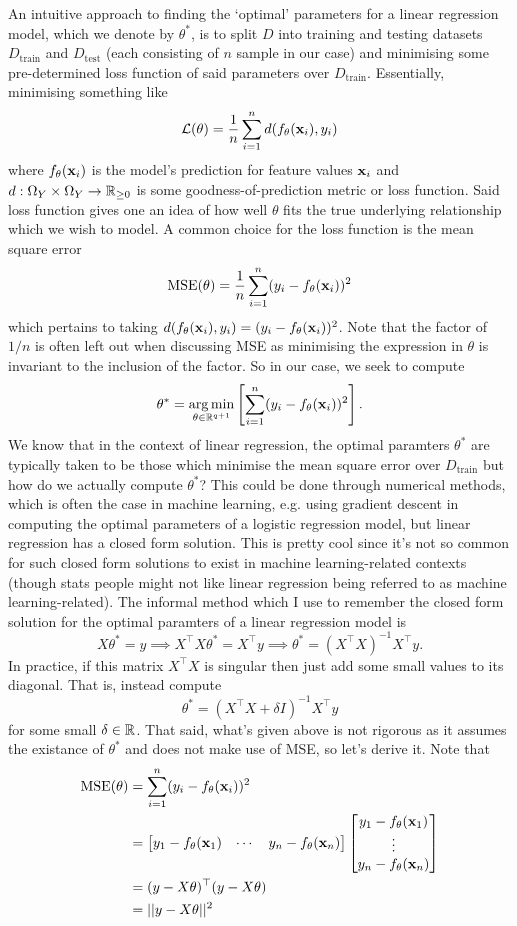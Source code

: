 \documentclass[11pt]{article}
\begin{document}
An intuitive approach to finding the `optimal' parameters for a linear regression model, which we denote by $\theta^{*}$, is to split $D$ into training and testing datasets $D_{\text{train}}$ and $D_{\text{test}}$ (each consisting of $n$ sample in our case) and minimising some pre-determined loss function of said parameters over $D_{\text{train}}$. Essentially, minimising something like
$$
\mathcal{L}(\theta)
=
\frac{1}{n}\sum_{i=1}^nd(f_{\theta}(\mathbf{x}_i), y_i)
$$
where $f_{\theta}(\mathbf{x}_i)$ is the model's prediction for feature values $\mathbf{x}_i$ and $d:\Omega_Y\times\Omega_Y\rightarrow\mathbb{R}_{\geq0}$ is some goodness-of-prediction metric or loss function. Said loss function gives one an idea of how well $\theta$ fits the true underlying relationship which we wish to model. A common choice for the loss function is the mean square error
$$
\text{MSE}(\theta)
=
\frac{1}{n}\sum_{i=1}^n(y_i-f_{\theta}(\mathbf{x}_i))^2
$$
which pertains to taking $d(f_{\theta}(\mathbf{x}_i), y_i)=(y_i-f_{\theta}(\mathbf{x}_i))^2$. Note that the factor of $1/n$ is often left out when discussing MSE as minimising the expression in $\theta$ is invariant to the inclusion of the factor. So in our case, we seek to compute
$$
\theta^{*}
=
\operatorname*{arg\,min}_{\theta\in\mathbb{R}^{q+1}}\left[\sum_{i=1}^n(y_i-f_{\theta}(\mathbf{x}_i))^2\right].
$$
We know that in the context of linear regression, the optimal paramters $\theta^{*}$ are typically taken to be those which minimise the mean square error over $D_{\text{train}}$ but how do we actually compute $\theta^{*}$? This could be done through numerical methods, which is often the case in machine learning, e.g. using gradient descent in computing the optimal parameters of a logistic regression model, but linear regression has a closed form solution. This is pretty cool since it's not so common for such closed form solutions to exist in machine learning-related contexts (though stats people might not like linear regression being referred to as machine learning-related). The informal method which I use to remember the closed form solution for the optimal paramters of a linear regression model is
$$
X\theta^{*}
=
y \implies X^{\top}X\theta^{*}=X^{\top}y \implies \theta^{*}=(X^{\top}X)^{-1}X^{\top}y.
$$
In practice, if this matrix $X^{\top}X$ is singular then just add some small values to its diagonal. That is, instead compute
$$
\theta^{*}
=
(X^{\top}X+\delta I)^{-1}X^{\top}y
$$
for some small $\delta\in\mathbb{R}$. That said, what's given above is not rigorous as it assumes the existance of $\theta^{*}$ and does not make use of MSE, so let's derive it. Note that
\begin{align*}
    \text{MSE}(\theta)
    &=
    \sum_{i=1}^n(y_i-f_{\theta}(\mathbf{x}_i))^2\\
    &=
    \begin{bmatrix}
        y_1-f_{\theta}(\mathbf{x}_1) & \cdots & y_n-f_{\theta}(\mathbf{x}_n)
    \end{bmatrix}
    \begin{bmatrix}
        y_1-f_{\theta}(\mathbf{x}_1)\\
        \vdots\\
        y_n-f_{\theta}(\mathbf{x}_n)
    \end{bmatrix}\\
    &=(y-X\theta)^{\top}(y-X\theta)\\
    &=||y-X\theta||^2
\end{align*}
\end{document}
